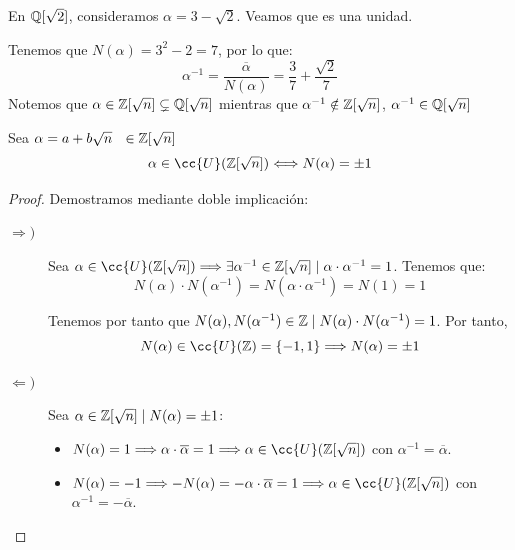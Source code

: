 \begin{ejemplo}
    En $\mathbb Q[\sqrt{2}]$, consideramos $\alpha = 3-\sqrt{2}$. Veamos que es una unidad.
    
    Tenemos que $N(\alpha) = 3^2 - 2 = 7$, por lo que:
    $$\alpha^{-1} = \dfrac{\overline{\alpha}}{N(\alpha)} = \dfrac{3}{7} + \dfrac{\sqrt{2}}{7}$$
    Notemos que $\alpha \in \mathbb Z[\sqrt{n}] \subsetneq \mathbb Q[\sqrt{n}]$ mientras que $\alpha^{-1} \notin \mathbb Z[\sqrt{n}]$, $\alpha^{-1} \in \mathbb Q[\sqrt{n}]$
\end{ejemplo}

\begin{prop}
    Sea $\alpha = a+b\sqrt{n} ~~\in \mathbb Z[\sqrt{n}]$
    $$\alpha \in \cc{U}(\Z[\sqrt{n}]) \Longleftrightarrow N(\alpha) = \pm 1$$
\end{prop}
\begin{proof} Demostramos mediante doble implicación:
\begin{description}
    \item[$\Longrightarrow)$] Sea $\alpha \in \cc{U}(\Z[\sqrt{n}]) \Longrightarrow \exists \alpha^{-1} \in \Z[\sqrt{n}] \mid \alpha \cdot \alpha^{-1} = 1$. Tenemos que:
    $$N(\alpha) \cdot N(\alpha^{-1}) = N(\alpha \cdot \alpha^{-1}) = N(1) = 1$$

    Tenemos por tanto que $N(\alpha), N(\alpha^{-1}) \in \mathbb Z \mid N(\alpha)\cdot N(\alpha^{-1}) = 1$. Por tanto,
    $$N(\alpha) \in \cc{U}(\Z) = \{-1, 1\} \Longrightarrow N(\alpha) = \pm 1$$

    \item[$\Longleftarrow)$] Sea $\alpha \in \mathbb Z[\sqrt{n}] \mid N(\alpha) = \pm 1$:
    \begin{itemize}
        \item $N(\alpha) = 1 \Longrightarrow \alpha \cdot \overline{\alpha} = 1 \Longrightarrow \alpha \in \cc{U}(\Z[\sqrt{n}])$ con $\alpha^{-1} = \overline{\alpha}$.

        \item $N(\alpha) = -1 \Longrightarrow -N(\alpha) = -\alpha \cdot \overline{\alpha} = 1 \Longrightarrow \alpha \in \cc{U}(\Z[\sqrt{n}])$ con $\alpha^{-1} =-\overline{\alpha}$.
    \end{itemize}
\end{description}
\end{proof}

